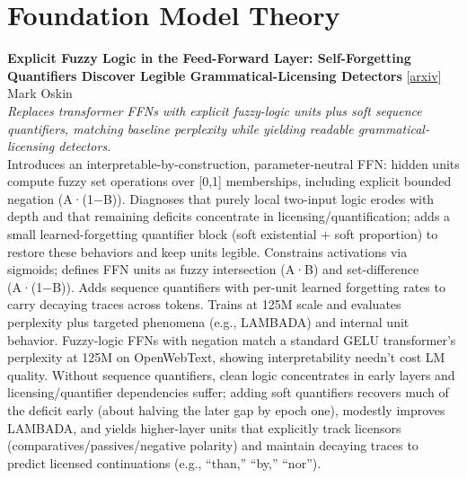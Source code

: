 \documentclass[12pt,letterpaper]{article}
\begin{document}
\medskip


\section*{Foundation Model Theory}

{\small\textbf{Explicit Fuzzy Logic in the Feed-Forward Layer: Self-Forgetting Quantifiers Discover Legible Grammatical-Licensing Detectors}} {\scriptsize[\href{https://arxiv.org/abs/2606.31845}{arxiv}]}\\
{\scriptsize Mark Oskin}\\

{\small\textit{Replaces transformer FFNs with explicit fuzzy-logic units plus soft sequence quantifiers, matching baseline perplexity while yielding readable grammatical-licensing detectors.}}\\[1pt]
{\footnotesize Introduces an interpretable-by-construction, parameter-neutral FFN: hidden units compute fuzzy set operations over [0,1] memberships, including explicit bounded negation (A·(1−B)). Diagnoses that purely local two-input logic erodes with depth and that remaining deficits concentrate in licensing/quantification; adds a small learned-forgetting quantifier block (soft existential + soft proportion) to restore these behaviors and keep units legible. Constrains activations via sigmoids; defines FFN units as fuzzy intersection (A·B) and set-difference (A·(1−B)). Adds sequence quantifiers with per-unit learned forgetting rates to carry decaying traces across tokens. Trains at 125M scale and evaluates perplexity plus targeted phenomena (e.g., LAMBADA) and internal unit behavior. Fuzzy-logic FFNs with negation match a standard GELU transformer's perplexity at 125M on OpenWebText, showing interpretability needn't cost LM quality. Without sequence quantifiers, clean logic concentrates in early layers and licensing/quantifier dependencies suffer; adding soft quantifiers recovers much of the deficit early (about halving the later gap by epoch one), modestly improves LAMBADA, and yields higher-layer units that explicitly track licensors (comparatives/passives/negative polarity) and maintain decaying traces to predict licensed continuations (e.g., ``than,'' ``by,'' ``nor'').}

\medskip
\end{document}
